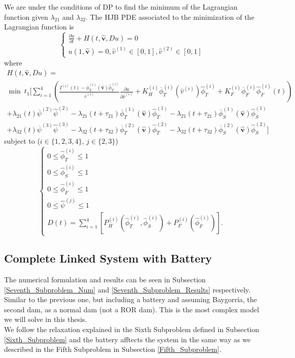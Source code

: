 We are under the conditions of DP to find the minimum of the Lagrangian function given $\lambda_{21}$ and $\lambda_{32}$. The HJB PDE associated to the minimization of the Lagrangian function is
\begin{equation}
\begin{cases}
\frac{\partial u}{\partial t}+H(t,\hat{\bm{v}},Du)=0\\
u(1,\hat{\bm{v}})=0,\hat{v}^{(1)}\in[0,1],\hat{v}^{(2)}\in[0,1]
\end{cases}
\end{equation}
where
\begin{multline}
H(t,\hat{\bm{v}},Du)=\\
\min\ t_1\Bigg[\sum_{i=1}^4\left(\frac{I^{(i)}(t)-\overline{\phi}_T^{(i)}(\hat{\bm{v}})\hat{\phi}_T^{(i)}}{\overline{v}^{(i)}}\frac{\partial u}{\partial \hat{v}^{(i)}}+K_H^{(i)}\overline{\phi}_T^{(i)}(\hat{v}^{(i)})\hat{\phi}_T^{(i)}+K_F^{(i)}\overline{\phi}_F^{(i)}\hat{\phi}_F^{(i)}(t)\right)\\
+\lambda_{21}(t)\overline{\psi}^{(2)}\hat{\psi}^{(2)}-\lambda_{21}(t+\tau_{21})\overline{\phi}^{(1)}_T(\hat{\bm{v}})\hat{\phi}^{(1)}_T-\lambda_{21}(t+\tau_{21})\overline{\phi}^{(1)}_S(\hat{\bm{v}})\hat{\phi}^{(1)}_S\\
+\lambda_{32}(t)\overline{\psi}^{(3)}\hat{\psi}^{(3)}-\lambda_{32}(t+\tau_{32})\overline{\phi}^{(2)}_T(\hat{\bm{v}})\hat{\phi}^{(2)}_T-\lambda_{32}(t+\tau_{32})\overline{\phi}^{(2)}_S(\hat{\bm{v}})\hat{\phi}^{(2)}_S\Bigg]
\label{Hamiltonian_6}
\end{multline}
subject to ($i\in\{1,2,3,4\}$, $j\in\{2,3\}$)
\begin{equation}
\begin{cases}
0\leq\hat{\phi}^{(i)}_T\leq1\\
0\leq\hat{\phi}^{(i)}_S\leq1\\
0\leq\hat{\phi}^{(i)}_F\leq1\\
0\leq\hat{\psi}^{(j)}\leq1\\
D(t)=\sum_{i=1}^4\left[P_H^{(i)}(\hat{\phi}_T^{(i)},\hat{\phi}_S^{(i)})+P_F^{(i)}(\hat{\phi}_F^{(i)})\right].
\end{cases}
\end{equation}

\subsection{Complete Linked System with Battery} \label{Seventh_Subproblem}

The numerical formulation and results can be seen in Subsection \ref{Seventh_Subproblem_Num} and \ref{Seventh_Subproblem_Results} respectively.\\

Similar to the previous one, but including a battery and assuming Baygorria, the second dam, as a normal dam (not a ROR dam). This is the most complex model we will solve in this thesis.\\
We follow the relaxation explained in the Sixth Subproblem defined in Subsection \ref{Sixth_Subproblem} and the battery afftects the system in the same way as we described in the Fifth Subproblem in Subsection \ref{Fifth_Subproblem}.